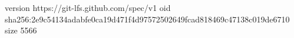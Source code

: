 version https://git-lfs.github.com/spec/v1
oid sha256:2e9c54134adabfe0ca19d471f4d97572502649fcad818469c47138c019de6710
size 5566
